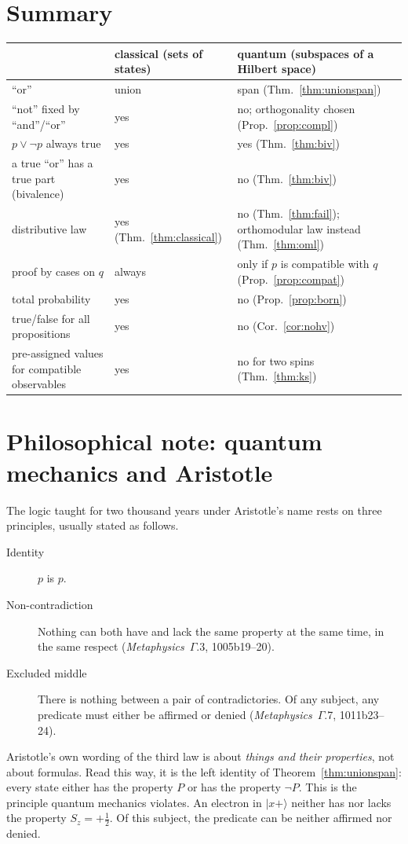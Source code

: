 \documentclass[11pt,a4paper]{article}
\theoremstyle{plain}
\theoremstyle{definition}
\theoremstyle{remark}
\newcommand{\ket}[1]{|#1\rangle}
\begin{document}
\section{Summary}
\begin{center}
\renewcommand{\arraystretch}{1.25}
\begin{tabularx}{\textwidth}{>{\raggedright\arraybackslash}p{4.2cm}>{\raggedright\arraybackslash}X>{\raggedright\arraybackslash}X}\toprule
 & \textbf{classical} (sets of states) & \textbf{quantum} (subspaces of a Hilbert space)\\\midrule
``or'' & union & span (Thm.~\ref{thm:unionspan}) \\
``not'' fixed by ``and''/``or'' & yes & no; orthogonality chosen (Prop.~\ref{prop:compl}) \\
$p\vee\neg p$ always true & yes & yes (Thm.~\ref{thm:biv}) \\
a true ``or'' has a true part (bivalence) & yes & no (Thm.~\ref{thm:biv}) \\
distributive law & yes (Thm.~\ref{thm:classical}) & no (Thm.~\ref{thm:fail}); orthomodular law instead (Thm.~\ref{thm:oml}) \\
proof by cases on $q$ & always & only if $p$ is compatible with $q$ (Prop.~\ref{prop:compat}) \\
total probability & yes & no (Prop.~\ref{prop:born}) \\
true/false for all propositions & yes & no (Cor.~\ref{cor:nohv}) \\
pre-assigned values for compatible observables & yes & no for two spins (Thm.~\ref{thm:ks}) \\\bottomrule
\end{tabularx}
\end{center}

\section{Philosophical note: quantum mechanics and Aristotle}
The logic taught for two thousand years under Aristotle's name rests on three principles, usually stated as follows.
\begin{description}
\item[Identity] $p$ is $p$.
\item[Non-contradiction] Nothing can both have and lack the same property at the same time, in the same respect (\emph{Metaphysics}~$\Gamma$.3, 1005b19--20).
\item[Excluded middle] There is nothing between a pair of contradictories. Of any subject, any predicate must either be affirmed or denied (\emph{Metaphysics}~$\Gamma$.7, 1011b23--24).
\end{description}
Aristotle's own wording of the third law is about \emph{things and their properties}, not about formulas. Read this way, it is the left identity of Theorem~\ref{thm:unionspan}: every state either has the property $P$ or has the property $\neg P$. This is the principle quantum mechanics violates. An electron in $\ket{x{+}}$ neither has nor lacks the property $S_z=+\tfrac12$. Of this subject, the predicate can be neither affirmed nor denied.
\end{document}
